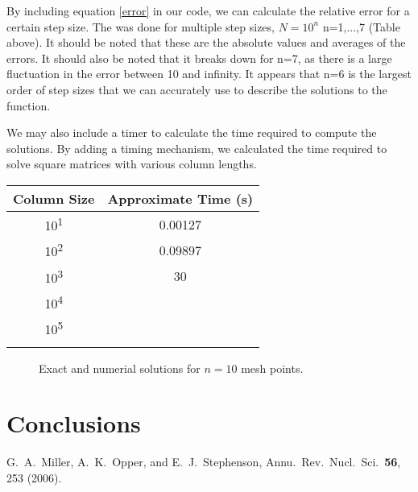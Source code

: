 \documentclass[10pt,showpacs,preprintnumbers,footinbib,amsmath,amssymb,aps,prl,twocolumn,groupedaddress,superscriptaddress,showkeys]{revtex4-1}
\begin{document}
	By including equation \ref{error} in our code, we can calculate the relative error for a certain step size.  The was done for multiple step sizes, $N=10^{n}$ n=1,...,7 (Table above).    It should be noted that these are the absolute values and averages of the errors.  It should also be noted that it breaks down for n=7, as there is a large fluctuation in the error between 10 and infinity.  It appears that n=6 is the largest order of step sizes that we can accurately use to describe the solutions to the function.
	
	We may also include a timer to calculate the time required to compute the solutions.  By adding a timing mechanism, we calculated the time required to solve square matrices with various column lengths.
	
	\begin{center}
		\begin{tabular}{cc}
			\hline \hline
			Column Size & Approximate Time (s)\\
			\hline
			10\textsuperscript{1} & 0.00127\\
			10\textsuperscript{2} & 0.09897\\
			10\textsuperscript{3} & 30\\
			10\textsuperscript{4} & \\
			10\textsuperscript{5} & \\
			\hline
			\label{timingtable}
		\end{tabular}
	\end{center}
	
	
\begin{figure}[hbtp]

\caption{Exact and numerial solutions for $n=10$ mesh points.} 
\label{fig:n10points}
\end{figure}

\section{Conclusions}

\begin{thebibliography}{99}
 G.~A.~Miller, A.~K.~Opper, and E.~J.~Stephenson, Annu.~Rev.~Nucl.~Sci.~{\bf 56}, 253 (2006).
\end{thebibliography}
\end{document}
